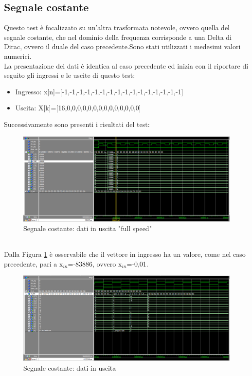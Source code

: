\documentclass[a4paper, titlepage]{article}
\begin{document}
\subsection{Segnale costante}
Questo test è focalizzato su un'altra trasformata notevole, ovvero quella del segnale costante, che nel dominio della frequenza corrisponde a una Delta di Dirac, ovvero il duale del caso precedente.Sono stati utilizzati i medesimi valori numerici.\\La presentazione dei dati è identica al caso precedente ed inizia con il riportare di seguito gli ingressi e le uscite di questo test:
\begin{itemize}
    \item Ingresso: x[n]=[-1,-1,-1,-1,-1,-1,-1,-1,-1,-1,-1,-1,-1,-1,-1,-1]
    \item Uscita:   X[k]=[16,0,0,0,0,0,0,0,0,0,0,0,0,0,0]
\end{itemize}
Successivamente sono presenti i risultati del test:
\begin{figure}[h]
    \centering
    \includegraphics[scale=0.45]{test_const(-1)/fs_cost(-1)_in.png}
    \caption{Segnale costante: dati in uscita "full speed"}
    \label{fig:const_in}
\end{figure}\\
Dalla Figura \ref{fig:const_in} è osservabile che il vettore in ingresso ha un valore, come nel caso precedente, pari a x$_{in}$=-83886, ovvero x$_{in}$=-0,01.
\pagebreak
\begin{figure}[h]
    \centering
    \includegraphics[scale=0.45]{test_const(-1)/fs_cost(-1)_out.png}
    \caption{Segnale costante: dati in uscita }
    \label{fig:const_out}
\end{figure}\\
\end{document}

